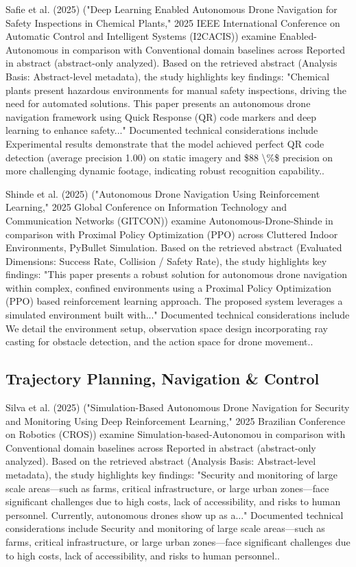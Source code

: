 \documentclass[10pt,twocolumn,letterpaper]{article}
\begin{document}
Safie et al. (2025) \cite{ref7} ("Deep Learning Enabled Autonomous Drone Navigation for Safety Inspections in Chemical Plants," 2025 IEEE International Conference on Automatic Control and Intelligent Systems (I2CACIS)) examine Enabled-Autonomous in comparison with Conventional domain baselines across Reported in abstract (abstract-only analyzed). Based on the retrieved abstract (Analysis Basis: Abstract-level metadata), the study highlights key findings: "Chemical plants present hazardous environments for manual safety inspections, driving the need for automated solutions. This paper presents an autonomous drone navigation framework using Quick Response (QR) code markers and deep learning to enhance safety..." Documented technical considerations include Experimental results demonstrate that the model achieved perfect QR code detection (average precision 1.00) on static imagery and \$88 \textbackslash{}\%\$ precision on more challenging dynamic footage, indicating robust recognition capability..

Shinde et al. (2025) \cite{ref8} ("Autonomous Drone Navigation Using Reinforcement Learning," 2025 Global Conference on Information Technology and Communication Networks (GITCON)) examine Autonomous-Drone-Shinde in comparison with Proximal Policy Optimization (PPO) across Cluttered Indoor Environments, PyBullet Simulation. Based on the retrieved abstract (Evaluated Dimensions: Success Rate, Collision / Safety Rate), the study highlights key findings: "This paper presents a robust solution for autonomous drone navigation within complex, confined environments using a Proximal Policy Optimization (PPO) based reinforcement learning approach. The proposed system leverages a simulated environment built with..." Documented technical considerations include We detail the environment setup, observation space design incorporating ray casting for obstacle detection, and the action space for drone movement..

\subsection{Trajectory Planning, Navigation \& Control}
Silva et al. (2025) \cite{ref6} ("Simulation-Based Autonomous Drone Navigation for Security and Monitoring Using Deep Reinforcement Learning," 2025 Brazilian Conference on Robotics (CROS)) examine Simulation-based-Autonomou in comparison with Conventional domain baselines across Reported in abstract (abstract-only analyzed). Based on the retrieved abstract (Analysis Basis: Abstract-level metadata), the study highlights key findings: "Security and monitoring of large scale areas—such as farms, critical infrastructure, or large urban zones—face significant challenges due to high costs, lack of accessibility, and risks to human personnel. Currently, autonomous drones show up as a..." Documented technical considerations include Security and monitoring of large scale areas—such as farms, critical infrastructure, or large urban zones—face significant challenges due to high costs, lack of accessibility, and risks to human personnel..
\end{document}
